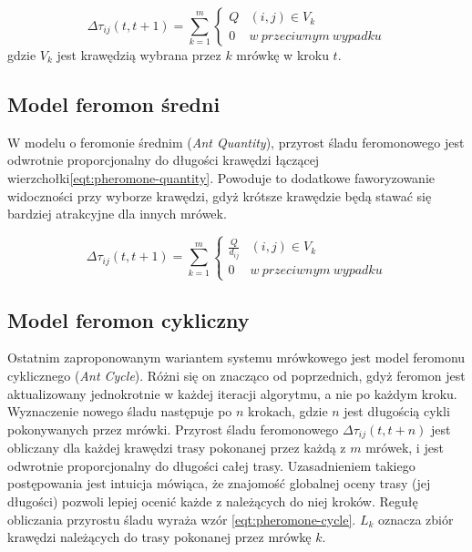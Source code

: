 {{{            \begin{equation}\label{eqt:pheromone-density}
                \Delta\tau_{ij}(t, t + 1) = \sum_{k=1}^m \left\{
                        \begin{matrix}
                            Q & (i, j) \in V_k\\
                            0 & w\ przeciwnym\ wypadku
                        \end{matrix}
                    \right.
            \end{equation}
            gdzie $V_k$ jest krawędzią wybrana przez $k$ mrówkę w kroku $t$.
        }

        \subsection{Model feromon średni}
        {
            W modelu o feromonie średnim (\textit{Ant Quantity}), przyrost śladu feromonowego jest odwrotnie
            proporcjonalny do długości krawędzi łączącej wierzchołki\ref{eqt:pheromone-quantity}. Powoduje to dodatkowe
            faworyzowanie widoczności przy wyborze krawędzi, gdyż krótsze krawędzie będą stawać się bardziej atrakcyjne
            dla innych mrówek.

            \begin{equation}\label{eqt:pheromone-quantity}
                \Delta\tau_{ij}(t, t + 1) = \sum_{k=1}^m \left\{
                        \begin{matrix}
                            \frac{Q}{d_{ij}} & (i, j) \in V_k\\
                            0 & w\ przeciwnym\ wypadku
                        \end{matrix}
                    \right.
            \end{equation}
        }

        \subsection{Model feromon cykliczny}
        {
            Ostatnim zaproponowanym wariantem systemu mrówkowego jest model feromonu cyklicznego (\textit{Ant Cycle}).
            Różni się on znacząco od poprzednich, gdyż feromon jest aktualizowany jednokrotnie w każdej iteracji
            algorytmu, a nie po każdym kroku. Wyznaczenie nowego śladu następuje po $n$ krokach, gdzie $n$ jest
            długością cykli pokonywanych przez mrówki. Przyrost śladu feromonowego $\Delta\tau_{ij}(t, t + n)$ jest
            obliczany dla każdej krawędzi trasy pokonanej przez każdą z $m$ mrówek, i jest odwrotnie proporcjonalny do
            długości całej trasy. Uzasadnieniem takiego postępowania jest intuicja mówiąca, że znajomość globalnej oceny
            trasy (jej długości) pozwoli lepiej ocenić każde z należących do niej kroków. Regułę obliczania przyrostu
            śladu wyraża wzór \ref{eqt:pheromone-cycle}. $L_k$ oznacza zbiór krawędzi należących do trasy pokonanej
            przez mrówkę $k$.

}}}
